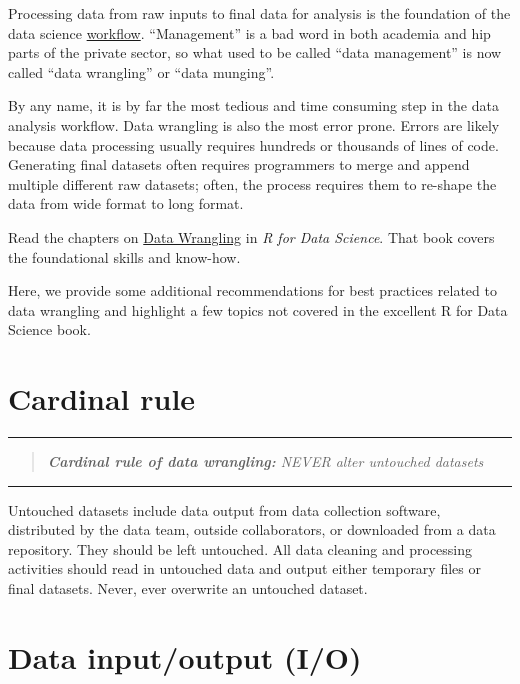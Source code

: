 \documentclass[]{book}
\begin{document}
Processing data from raw inputs to final data for analysis is the foundation of the data science \protect\hyperlink{workflows}{workflow}. ``Management'' is a bad word in both academia and hip parts of the private sector, so what used to be called ``data management'' is now called ``data wrangling'' or ``data munging''.

By any name, it is by far the most tedious and time consuming step in the data analysis workflow. Data wrangling is also the most error prone. Errors are likely because data processing usually requires hundreds or thousands of lines of code. Generating final datasets often requires programmers to merge and append multiple different raw datasets; often, the process requires them to re-shape the data from wide format to long format.

Read the chapters on \href{https://r4ds.had.co.nz/}{Data Wrangling} in \emph{R for Data Science}. That book covers the foundational skills and know-how.

Here, we provide some additional recommendations for best practices related to data wrangling and highlight a few topics not covered in the excellent R for Data Science book.

\hypertarget{cardinal-rule}{%
\section{Cardinal rule}\label{cardinal-rule}}

\begin{center}\rule{0.5\linewidth}{\linethickness}\end{center}

\begin{quote}
\emph{\textbf{Cardinal rule of data wrangling:} NEVER alter untouched datasets}
\end{quote}

\begin{center}\rule{0.5\linewidth}{\linethickness}\end{center}

Untouched datasets include data output from data collection software, distributed by the data team, outside collaborators, or downloaded from a data repository. They should be left untouched. All data cleaning and processing activities should read in untouched data and output either temporary files or final datasets. Never, ever overwrite an untouched dataset.

\hypertarget{data-inputoutput-io}{%
\section{Data input/output (I/O)}\label{data-inputoutput-io}}
\end{document}
